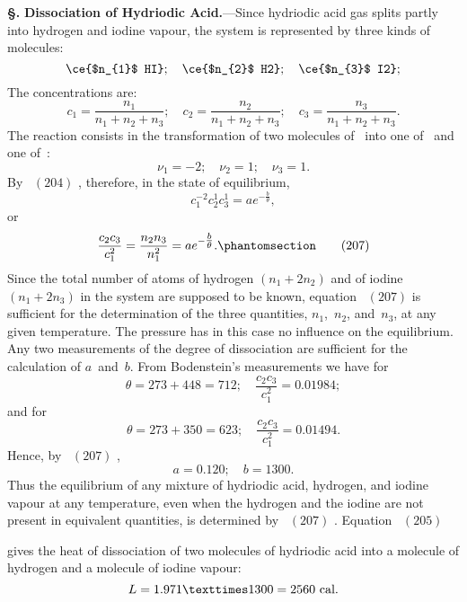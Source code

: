 \documentclass[12pt]{book}[2005/09/16]
\newcommand{\Chg}[2]{#2}
\newcommand{\Add}[1]{\Chg{}{#1}}
\newcommand{\Section}[1]{
  \medskip\par\textbf{§\;#1}
  \label{section:#1}
}
\newcommand{\Tag}[1]{%
  \phantomsection\label{eqn:#1}\tag*{\ensuremath{#1}}%
}
\newcommand{\Eq}[1]{%
  \hyperref[eqn:#1]{\ensuremath{#1}}%
}
\newcommand{\PageSep}[1]{\ignorespaces}
\newcommand{\Topic}[1]{\textbf{#1}}
\newcommand{\efrac}[2]{\tfrac{#1}{#2}}
\newcommand{\Unit}[1]{\text{\upshape #1}}
\begin{document}
\Section{245.} \Topic{Dissociation of Hydriodic Acid.}---Since hydriodic
%
%
acid gas splits partly into hydrogen and iodine vapour, the
system is represented by three kinds of molecules:
\[
\ce{$n_{1}$ HI};\quad
\ce{$n_{2}$ H2};\quad
\ce{$n_{3}$ I2};
\]
The concentrations are:
\[
c_{1} = \frac{n_{1}}{n_{1} + n_{2} + n_{3}};\quad
c_{2} = \frac{n_{2}}{n_{1} + n_{2} + n_{3}};\quad
c_{3} = \frac{n_{3}}{n_{1} + n_{2} + n_{3}}.
\]
The reaction consists in the transformation of two molecules
of~ into one of~ and one of~:
\[
\nu_{1} = -2;\quad
\nu_{2} = 1;\quad
\nu_{3} = 1.
\]
By~\Eq{(204)}, therefore, in the state of equilibrium,
\[
c_{1}^{-2} c_{2}^{1} c_{3}^{1} = ae^{-\efrac{b}{\theta}}\Add{,}
\]
or
\[
\frac{c_{2}c_{3}}{c_{1}^{2}} = \frac{n_{2}n_{3}}{n_{1}^{2}} = ae^{-\efrac{b}{\theta}}\Add{.}
\Tag{(207)}
\]
Since the total number of atoms of hydrogen $(n_{1} + 2n_{2})$
and of iodine $(n_{1} + 2n_{3})$ in the system are supposed to be
known, equation~\Eq{(207)} is sufficient for the determination of
the three quantities, $n_{1}$,~$n_{2}$, and~$n_{3}$, at any given temperature.
The pressure has in this case no influence on the equilibrium.
Any two measurements of the degree of dissociation
are sufficient for the calculation of $a$~and~$b$. From Bodenstein's
%
measurements we have for
\[
\theta = 273 + 448 = 712;\quad
\frac{c_{2}c_{3}}{c_{1}^{2}} = 0.01984;
\]
\PageSep{220}
and for
\[
\theta = 273 + 350 = 623;\quad
\frac{c_{2}c_{3}}{c_{1}^{2}} = 0.01494.
\]
Hence, by~\Eq{(207)},
\[
a = 0.120;\quad
b = 1300.
\]
Thus the equilibrium of any mixture of hydriodic acid,
hydrogen, and iodine vapour at any temperature, even
when the hydrogen and the iodine are not present in
equivalent quantities, is determined by~\Eq{(207)}. Equation~\Eq{(205)}
gives the heat of dissociation of two molecules of
%
%
hydriodic acid into a molecule of hydrogen and a molecule
of iodine vapour:
\[
L = 1.971 × 1300 = 2560~\Unit{cal.}
\]
\end{document}
